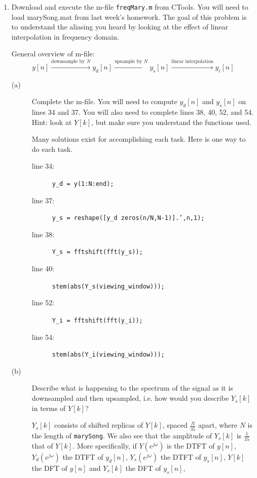\documentclass[11pt]{article}
\begin{document}
\begin{enumerate}

\item Download and execute the m-file \texttt{freqMary.m} from CTools. You will need to load marySong.mat from last week's homework. The goal of this problem is to understand the aliasing you heard by looking at the effect of linear interpolation in frequency domain. %

General overview of m-file:
\[ y[n] \stackrel{\text{downsample by }N}{\longrightarrow} y_d[n] \stackrel{\text{upsample by }N}{\longrightarrow} y_s[n] \stackrel{\text{linear interpolation}}{\longrightarrow} y_i[n]
\]


\vspace{2mm}

\begin{description}
\item [(a)] Complete the m-file. You will need to compute $y_d[n]$ and $y_s[n]$ on lines 34 and 37.
You will also need to complete lines 38, 40, 52, and 54. Hint: look at $Y[k]$, but make sure you understand the functions used.


Many solutions exist for accomplishing each task. Here is one way to do each task.
\begin{description}
\item[line 34:] \texttt{y\_d = y(1:N:end);}
\item[line 37:] \texttt{y\_s = reshape([y\_d zeros(n/N,N-1)].',n,1);}
\item[line 38:] \texttt{Y\_s = fftshift(fft(y\_s));}
\item[line 40:] \texttt{stem(abs(Y\_s(viewing\_window)));}
\item[line 52:] \texttt{Y_i = fftshift(fft(y\_i));}
\item[line 54:] \texttt{stem(abs(Y\_i(viewing\_window)));}
\end{description}

\item [(b)] Describe what is happening to the spectrum of the signal as it is downsampled and then upsampled, i.e. how would you describe $Y_s[k]$ in terms of $Y[k]$?

$Y_s[k]$ consists of shifted replicas of $Y[k]$, spaced $\frac{N}{35}$ apart, where $N$ is the length of \texttt{marySong}. We also see that the amplitude of $Y_s[k]$ is $\frac{1}{35}$ that of $Y[k]$. More specifically, if $Y(e^{j \omega})$ is the DTFT of $y[n]$, $Y_d(e^{j \omega})$ the DTFT of $y_d[n]$, $Y_s(e^{j \omega})$ the DTFT of $y_s[n]$, $Y[k]$ the DFT of $y[n]$ and $Y_s[k]$ the DFT of $y_s[n]$,


\end{description}
\end{enumerate}
\end{document}
